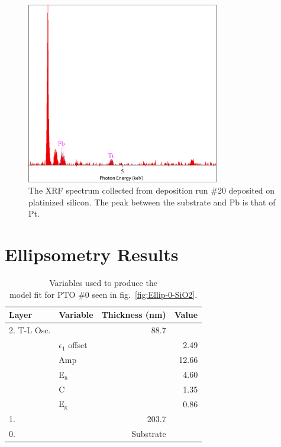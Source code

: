 \begin{figure}[htbp]
	\centering
	\includegraphics[width=0.75\textwidth]{./Figures/Appendix/Composition/PTO-run20-pt.png}
	\caption[XRF Spectrum of PTO \#20 on Pt-Si]%
		     {The XRF spectrum collected from deposition run \#20 deposited on platinized silicon. The peak between the substrate and Pb is that of Pt. }
	\label{fig:XRF-20-Pt}
\end{figure}

\clearpage

\section{Ellipsometry Results}
\label{sup:Ellipsometry}

\begin{table}[htbp]
	\centering
	\caption[PTO \#0 Ellipsometric Model Variables]{Variables used to produce the\\model fit for PTO \#0 seen in fig.~\vref{fig:Ellip-0-SiO2}. \label{tbl:PTO-0-ellip-variables}}
	\begin{tabular}{l l r r}
	\toprule
	Layer&Variable&Thickness (nm)&Value\\
	\midrule
	2. T-L Osc.&&88.7&\\
	&$\epsilon_{1}$ offset&&2.49\\
	&Amp&&12.66\\
	&E$_{\mathrm{n}}$&&4.60\\
	&C&&1.35\\
	&E$_{\mathrm{g}}$&&0.86\\
	1. \ce{SiO2}&&203.7&\\
	0. \ce{Si}&&Substrate&\\
	\bottomrule
	\end{tabular}
\end{table}

